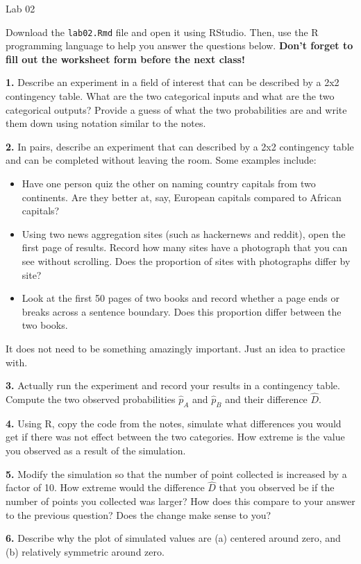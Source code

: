 \documentclass{tufte-handout}
\begin{document}
\justify

{\LARGE Lab 02}

\vspace*{18pt}

Download the \texttt{lab02.Rmd} file and open it using RStudio. Then, use the
R programming language to help you answer the questions below. \textbf{Don't
forget to fill out the worksheet form before the next class!}

\vspace*{12pt}

\textbf{1.} Describe an experiment in a field of interest that can be
described by a 2x2 contingency table. What are the two categorical inputs
and what are the two categorical outputs? Provide a guess of what the two
probabilities are and write them down using notation similar to the notes.

\textbf{2.} In pairs, describe an experiment that can described by a 2x2
contingency table and can be completed without leaving the room. Some examples
include:
\begin{itemize}
\item Have one person quiz the other on naming country capitals from two
continents. Are they better at, say, European capitals compared to African
capitals?
\item Using two news aggregation sites (such as hackernews and reddit), open
the first page of results. Record how many sites have a photograph that you
can see without scrolling. Does the proportion of sites with photographs
differ by site?
\item Look at the first 50 pages of two books and record whether a page ends
or breaks across a sentence boundary. Does this proportion differ between the
two books.
\end{itemize}
It does not need to be something amazingly important. Just an idea to practice
with.

\textbf{3.} Actually run the experiment and record your results in a
contingency table. Compute the two observed probabilities $\widehat{p}_A$
and $\widehat{p}_B$ and their difference $\widehat{D}$.

\textbf{4.} Using R, copy the code from the notes, simulate what differences
you would get if there was not effect between the two categories. How extreme
is the value you observed as a result of the simulation.

\textbf{5.} Modify the simulation so that the number of point collected is
increased by a factor of 10. How extreme would the difference $\widehat{D}$
that you observed be if the number of points you collected was larger? How
does this compare to your answer to the previous question? Does the change
make sense to you?

\textbf{6.} Describe why the plot of simulated values are (a) centered around
zero, and (b) relatively symmetric around zero.
\end{document}
